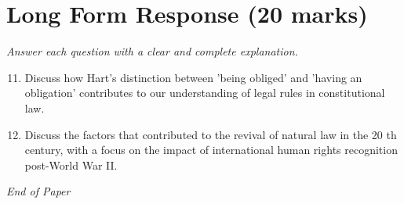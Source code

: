 \documentclass[12pt]{article}
\begin{document}
\section*{Long Form Response (20 marks)}
\textit{Answer each question with a clear and complete explanation.}
\begin{enumerate}[label=\arabic*.]
\setcounter{enumi}{10}
\item Discuss how Hart's distinction between 'being obliged' and 'having an obligation' contributes to our understanding of legal rules in constitutional law.
\item Discuss the factors that contributed to the revival of natural law in the 20 th century, with a focus on the impact of international human rights recognition post-World War II.
\end{enumerate}

\vfill
\noindent\textit{End of Paper}
\end{document}
